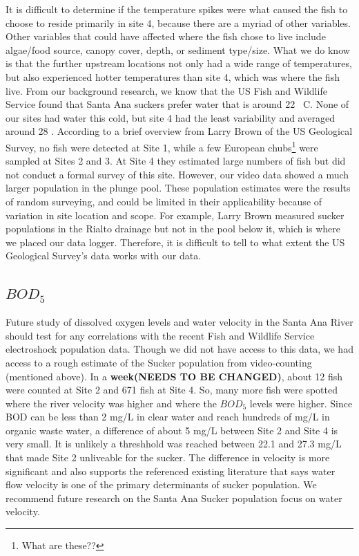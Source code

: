\documentclass{article}\usepackage[]{graphicx}\usepackage[]{color}
\begin{document}
It is difficult to determine if the temperature spikes were what caused the fish to choose to reside primarily in site 4, because there are a myriad of other variables. Other variables that could have affected where the fish chose to live include algae/food source, canopy cover, depth, or sediment type/size. What we do know is that the further upstream locations not only had a wide range of temperatures, but also experienced hotter temperatures than site 4, which was where the fish live. From our background research, we know that the US Fish and Wildlife Service found that Santa Ana suckers prefer water that is around 22 \textdegree~C. None of our sites had water this cold, but site 4 had the least variability and averaged around 28 \textdegree. According to a brief overview from Larry Brown of the US Geological Survey, no fish were detected at Site 1, while a few European chubs\footnote{What are these??} were sampled at Sites 2 and 3. At Site 4 they estimated large numbers of fish but did not conduct a formal survey of this site. However, our video data showed a much larger population in the plunge pool. These population estimates were the results of random surveying, and could be limited in their applicability because of variation in site location and scope. For example, Larry Brown measured sucker populations in the Rialto drainage but not in the pool below it, which is where we placed our data logger. Therefore, it is difficult to tell to what extent the US Geological Survey's data works with our data. 

\subsection{$BOD_5$}
Future study of dissolved oxygen levels and water velocity in the Santa Ana River should test for any correlations with the recent Fish and Wildlife Service electroshock population data. Though we did not have access to this data, we had access to a rough estimate of the Sucker population from video-counting (mentioned above). In a \textbf{week(NEEDS TO BE CHANGED)}, about 12 fish were counted at Site 2 and 671 fish at Site 4. So, many more fish were spotted where the river velocity was higher and where the $BOD_5$ levels were higher. Since BOD can be less than 2 mg/L in clear water and reach hundreds of mg/L in organic waste water, a difference of about 5 mg/L between Site 2 and Site 4 is very small. It is unlikely a threshhold was reached between 22.1 and 27.3 mg/L that made Site 2 unliveable for the sucker. The difference in velocity is more significant and also supports the referenced existing literature that says water flow velocity is one of the primary determinants of sucker population. We recommend future research on the Santa Ana Sucker population focus on water velocity.
\end{document}
